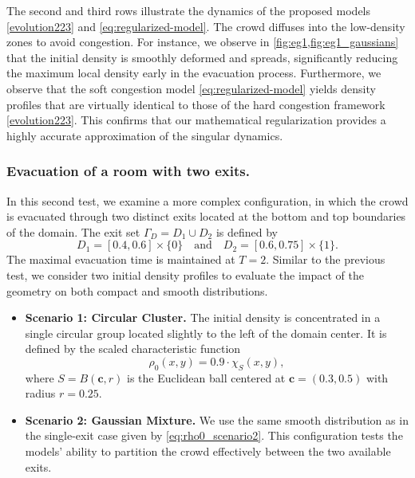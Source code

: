 \documentclass[final,reqno]{amsart}
\theoremstyle{plain}
\theoremstyle{definition}
\theoremstyle{remark}
\numberwithin{remark}{section}	%
\numberwithin{example}{section}	%
\begin{document}
The second and third rows illustrate the dynamics of the proposed models \eqref{evolution223} and \eqref{eq:regularized-model}. The crowd diffuses into the low-density zones to avoid congestion. For instance, we observe in \cref{fig:eg1,fig:eg1_gaussians} that the initial density is smoothly deformed and spreads, significantly reducing the maximum local density early in the evacuation process. Furthermore, we observe that the soft congestion model \eqref{eq:regularized-model} yields density profiles that are virtually identical to those of the hard congestion framework \eqref{evolution223}. This confirms that our mathematical regularization provides a highly accurate approximation of the singular dynamics.

\subsubsection{Evacuation of a room with two exits.} 
In this second test, we examine a more complex configuration, in which the crowd is evacuated through two distinct exits located at the bottom and top boundaries of the domain. The exit set $\Gamma_D = D_1 \cup D_2$ is defined by
\begin{equation}
    D_1 = [0.4, 0.6] \times \{0\} \quad \text{and} \quad D_2 = [0.6, 0.75] \times \{1\}.
\end{equation}
The maximal evacuation time is maintained at $T=2$.
Similar to the previous test, we consider two initial density profiles to evaluate the impact of the geometry on both compact and smooth distributions.
\begin{itemize}
    \item \textbf{Scenario 1: Circular Cluster.}
    The initial density is concentrated in a single circular group located slightly to the left of the domain center. It is defined by the scaled characteristic function
    \begin{equation}
        \rho_{0}(x,y) = 0.9 \cdot \chi_{S}(x,y),
    \end{equation}
    where $S = B(\mathbf{c}, r)$ is the Euclidean ball centered at $\mathbf{c}=(0.3, 0.5)$ with radius $r=0.25$.

    \item \textbf{Scenario 2: Gaussian Mixture.}
    We use the same smooth distribution as in the single-exit case given by \eqref{eq:rho0_scenario2}. This configuration tests the models' ability to partition the crowd effectively between the two available exits.
\end{itemize}
\end{document}
